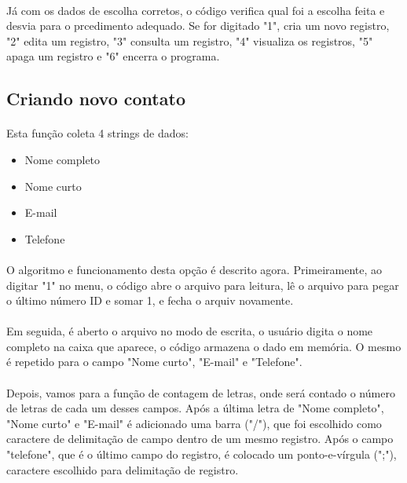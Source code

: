 \documentclass[12pt]{article}
\begin{document}
	\paragraph{}
	Já com os dados de escolha corretos, o código verifica qual foi a escolha feita e desvia para o prcedimento adequado. Se for digitado "1", cria um novo registro, "2" edita um registro, "3" consulta um registro, "4" visualiza os registros, "5" apaga um registro e "6" encerra o programa.
\subsection{Criando novo contato}
    \paragraph{}
    Esta função coleta 4 strings de dados:
    \begin{itemize}
    \item Nome completo
    \item Nome curto
    \item E-mail
    \item Telefone
    \end{itemize}
    
    \paragraph{}
    O algoritmo e funcionamento desta opção é descrito agora. Primeiramente, ao digitar "1" no menu, o código abre o arquivo para leitura, lê o arquivo para pegar o último número ID e somar 1, e fecha o arquiv novamente.
    \paragraph{}
    Em seguida, é aberto o arquivo no modo de escrita, o usuário digita o nome completo na caixa que aparece, o código armazena o dado em memória. O mesmo é repetido para o campo "Nome curto", "E-mail" e "Telefone".
    \paragraph{}
    Depois, vamos para a função de contagem de letras, onde será contado o número de letras de cada um desses campos. Após a última letra de "Nome completo", "Nome curto" e "E-mail" é adicionado uma barra ("/"), que foi escolhido como caractere de delimitação de campo dentro de um mesmo registro. Após o campo "telefone", que é o último campo do registro, é colocado um ponto-e-vírgula (";"), caractere escolhido para delimitação de registro. 
\end{document}
